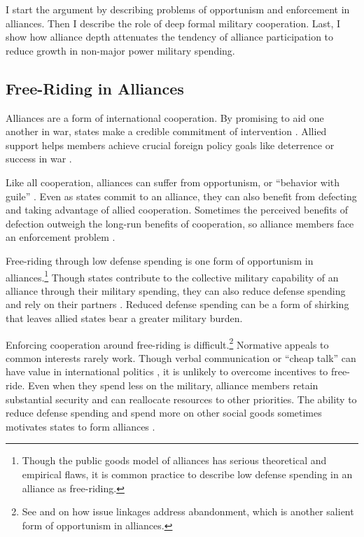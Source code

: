 \documentclass[12pt]{article}
\begin{document}
I start the argument by describing problems of opportunism and enforcement in alliances. 
Then I describe the role of deep formal military cooperation. 
Last, I show how alliance depth attenuates the tendency of alliance participation to reduce growth in non-major power military spending. 


\subsection{Free-Riding in Alliances}

Alliances are a form of international cooperation. 
By promising to aid one another in war, states make a credible commitment of intervention \citep{Fearon1997, Morrow2000}. 
Allied support helps members achieve crucial foreign policy goals like deterrence or success in war \citep{Walt1990, Snyder1997}. 


Like all cooperation, alliances can suffer from opportunism, or ``behavior with guile'' \citep{Williamson1985}. 
Even as states commit to an alliance, they can also benefit from defecting and taking advantage of allied cooperation. 
Sometimes the perceived benefits of defection outweigh the long-run benefits of cooperation, so alliance members face an enforcement problem \citep{Fearon1998a, Koremenosetal2001}.


Free-riding through low defense spending is one form of opportunism in alliances.\footnote{Though the public goods model of alliances has serious theoretical and empirical flaws, it is common practice to describe low defense spending in an alliance as free-riding.}
Though states contribute to the collective military capability of an alliance through their military spending, they can also reduce defense spending and rely on their partners \citep{OlsonZeckhauser1966, Morrow1993, Conybeare1994, SandlerHartley2001}.
Reduced defense spending can be a form of shirking that leaves allied states bear a greater military burden. 


Enforcing cooperation around free-riding is difficult.\footnote{See \citet{Poast2012, Poast2013} and \citet{LongLeeds2006} on how issue linkages address abandonment, which is another salient form of opportunism in alliances.}
Normative appeals to common interests rarely work. 
Though verbal communication or ``cheap talk'' can have value in international politics \citep{Trager2010}, it is unlikely to overcome incentives to free-ride. 
Even when they spend less on the military, alliance members retain substantial security and can reallocate resources to other priorities. 
The ability to reduce defense spending and spend more on other social goods sometimes motivates states to form alliances \citep{Kimball2010, AllenDigiuseppe2013}. 
\end{document}
